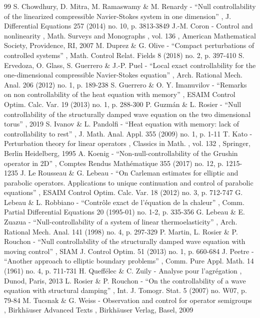 \documentclass[11pt]{article}
\begin{document}
\begin{thebibliography}{99}
 S. Chowdhury, D. Mitra, M. Ramaswamy \& M. Renardy - “Null controllability of the linearized compressible Navier-Stokes system in one dimension” , J. Differential Equations 257 (2014) no. 10, p. 3813-3849
 J.-M. Coron - Control and nonlinearity , Math. Surveys and Monographs , vol. 136 , American Mathematical Society, Providence, RI, 2007
 M. Duprez \& G. Olive - “Compact perturbations of controlled systems” , Math. Control Relat. Fields 8 (2018) no. 2, p. 397-410
 S. Ervedoza, O. Glass, S. Guerrero \& J.-P. Puel - “Local exact controllability for the one-dimensional compressible Navier-Stokes equation” , Arch. Rational Mech. Anal. 206 (2012) no. 1, p. 189-238
 S. Guerrero \& O. Y. Imanuvilov - “Remarks on non controllability of the heat equation with memory” , ESAIM Control Optim. Calc. Var. 19 (2013) no. 1, p. 288-300
 P. Guzmán \& L. Rosier - “Null controllability of the structurally damped wave equation on the two dimensional torus” , 2019
 S. Ivanov \& L. Pandolfi - “Heat equation with memory: lack of controllability to rest” , J. Math. Anal. Appl. 355 (2009) no. 1, p. 1-11
 T. Kato - Perturbation theory for linear operators , Classics in Math. , vol. 132 , Springer, Berlin Heidelberg, 1995
 A. Koenig - “Non-null-controllability of the Grushin operator in 2D” , Comptes Rendus Mathématique 355 (2017) no. 12, p. 1215-1235
 J. Le Rousseau \& G. Lebeau - “On Carleman estimates for elliptic and parabolic operators. Applications to unique continuation and control of parabolic equations” , ESAIM Control Optim. Calc. Var. 18 (2012) no. 3, p. 712-747
 G. Lebeau \& L. Robbiano - “Contrôle exact de l’équation de la chaleur” , Comm. Partial Differential Equations 20 (1995-01) no. 1-2, p. 335-356
 G. Lebeau \& E. Zuazua - “Null-controllability of a system of linear thermoelasticity” , Arch. Rational Mech. Anal. 141 (1998) no. 4, p. 297-329
 P. Martin, L. Rosier \& P. Rouchon - “Null controllability of the structurally damped wave equation with moving control” , SIAM J. Control Optim. 51 (2013) no. 1, p. 660-684
 J. Peetre - “Another approach to elliptic boundary problems” , Comm. Pure Appl. Math. 14 (1961) no. 4, p. 711-731
 H. Queffélec \& C. Zuily - Analyse pour l’agrégation , Dunod, Paris, 2013
 L. Rosier \& P. Rouchon - “On the controllability of a wave equation with structural damping” , Int. J. Tomogr. Stat. 5 (2007) no. W07, p. 79-84
 M. Tucsnak \& G. Weiss - Observation and control for operator semigroups , Birkhäuser Advanced Texts , Birkhäuser Verlag, Basel, 2009
\end{thebibliography}
\end{document}
